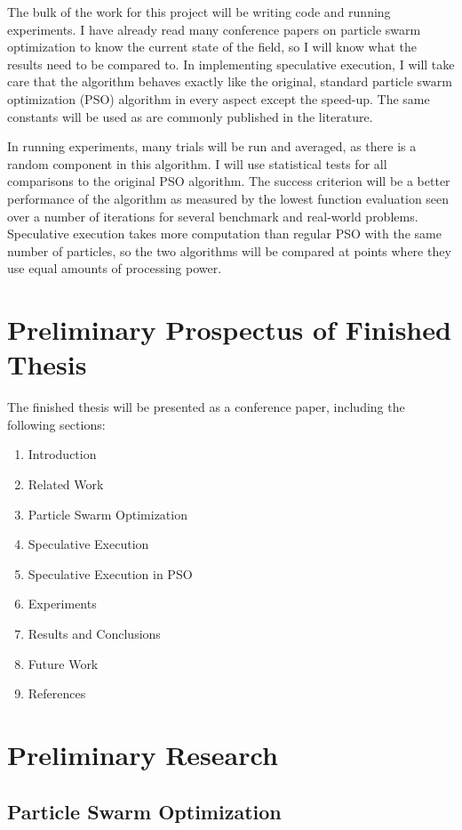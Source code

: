 \documentclass[onecolumn, 12pt]{article}
\begin{document}
The bulk of the work for this project will be writing code and running
experiments.  I have already read many conference papers on particle swarm
optimization to know the current state of the field, so I will know what the
results need to be compared to.  In implementing speculative execution, I will
take care that the algorithm behaves exactly like the original, standard
particle swarm optimization (PSO) algorithm in every aspect except the
speed-up.  The same constants will be used as are commonly published in the
literature.

In running experiments, many trials will be run and averaged, as there is a
random component in this algorithm.  I will use statistical tests for all
comparisons to the original PSO algorithm.  The success criterion will be a
better performance of the algorithm as measured by the lowest function
evaluation seen over a number of iterations for several benchmark and
real-world problems.  Speculative execution takes more computation than regular
PSO with the same number of particles, so the two algorithms will be compared
at points where they use equal amounts of processing power.

\section{Preliminary Prospectus of Finished Thesis}

The finished thesis will be presented as a conference paper, including the
following sections:

\begin{enumerate}
\item Introduction
\item Related Work
\item Particle Swarm Optimization
\item Speculative Execution
\item Speculative Execution in PSO
\item Experiments
\item Results and Conclusions
\item Future Work
\item References
\end{enumerate}

\section{Preliminary Research}

\subsection{Particle Swarm Optimization}
\end{document}
